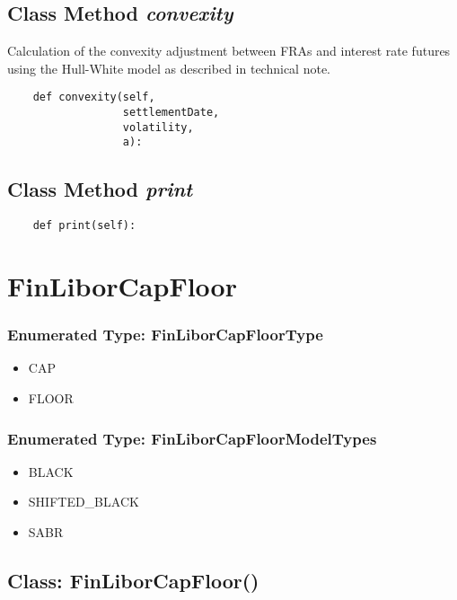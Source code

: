 \documentclass[twoside,11pt]{book}
\begin{document}
\subsection{Class Method {\it convexity}}
Calculation of the convexity adjustment between FRAs and interest rate futures using the Hull-White model as described in technical note. 

\begin{lstlisting}
    def convexity(self, 
                  settlementDate,
                  volatility, 
                  a):
\end{lstlisting}

\subsection{Class Method {\it print}}


\begin{lstlisting}
    def print(self):
\end{lstlisting}

\newpage
\section{FinLiborCapFloor}

\subsubsection{Enumerated Type: FinLiborCapFloorType}
\begin{itemize}
\item{CAP}
\item{FLOOR}
\end{itemize}

\subsubsection{Enumerated Type: FinLiborCapFloorModelTypes}
\begin{itemize}
\item{BLACK}
\item{SHIFTED\_BLACK}
\item{SABR}
\end{itemize}

\subsection{Class: FinLiborCapFloor()}
\end{document}
